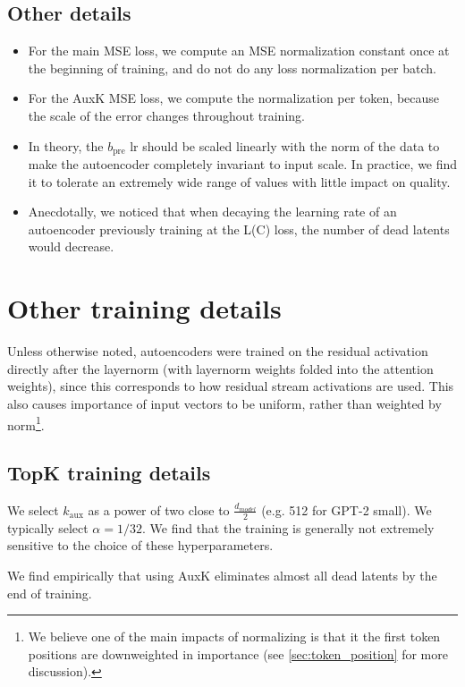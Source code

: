 \subsection{Other details}

\begin{itemize}
    \item For the main MSE loss, we compute an MSE normalization constant once at the beginning of training, and do not do any loss normalization per batch.
    \item For the AuxK MSE loss, we compute the normalization per token, because the scale of the error changes throughout training.
    \item In theory, the $b_{\text{pre}}$ lr should be scaled linearly with the norm of the data to make the autoencoder completely invariant to input scale. In practice, we find it to tolerate an extremely wide range of values with little impact on quality.
    \item Anecdotally, we noticed that when decaying the learning rate of an autoencoder previously training at the L(C) loss, the number of dead latents would decrease.
\end{itemize}



\section{Other training details}
\label{sec:training-details}

Unless otherwise noted, autoencoders were trained on the residual activation directly after the layernorm (with layernorm weights folded into the attention weights), since this corresponds to how residual stream activations are used. This also causes importance of input vectors to be uniform, rather than weighted by norm\footnote{We believe one of the main impacts of normalizing is that it the first token positions are downweighted in importance (see \autoref{sec:token_position} for more discussion).}. 
\subsection{TopK training details}


We select $k_\text{aux}$ as a power of two close to $\frac{d_{model}}{2}$ (e.g. 512 for GPT-2 small). We typically select $\alpha = 1 / 32$. We find that the training is generally not extremely sensitive to the choice of these hyperparameters.

We find empirically that using AuxK eliminates almost all dead latents by the end of training.

